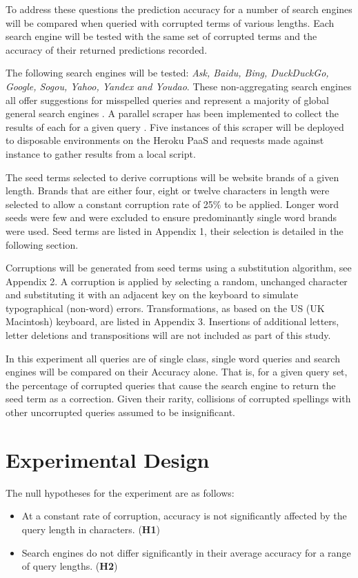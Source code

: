 \documentclass{csfourzero}
\begin{document}
To address these questions the prediction accuracy for a number of search engines will be compared when queried with corrupted terms of various lengths. Each search engine will be tested with the same set of corrupted terms and the accuracy of their returned predictions recorded.

The following search engines will be tested: \textit{Ask, Baidu, Bing, DuckDuckGo, Google, Sogou, Yahoo, Yandex and Youdao}. These non-aggregating search engines all offer suggestions for misspelled queries and represent a majority of global general search engines \cite{searchenginewiki}. A parallel scraper has been implemented to collect the results of each for a given query \cite{scraper}. Five instances of this scraper will be deployed to disposable environments on the Heroku PaaS and requests made against instance to gather results from a local script.

The seed terms selected to derive corruptions will be website brands of a given length. Brands that are either four, eight or twelve characters in length were selected to allow a constant corruption rate of 25\% to be applied. Longer word seeds were few and were excluded to ensure predominantly single word brands were used. Seed terms are listed in Appendix 1, their selection is detailed in the following section.

Corruptions will be generated from seed terms using a substitution algorithm, see Appendix 2. A corruption is applied by selecting a random, unchanged character and substituting it with an adjacent key on the keyboard to simulate typographical (non-word) errors. Transformations, as based on the US (UK Macintosh) keyboard, are listed in Appendix 3. Insertions of additional letters, letter deletions and transpositions will are not included as part of this study.

In this experiment all queries are of single class, single word queries and search engines will be compared on their Accuracy alone. That is, for a given query set, the percentage of corrupted queries that cause the search engine to return the seed term as a correction. Given their rarity, collisions of corrupted spellings with other uncorrupted queries assumed to be insignificant.

\section{Experimental Design}
\label{sec:exp}

The null hypotheses for the experiment are as follows:
\begin{itemize}
  \item{At a constant rate of corruption, accuracy is not significantly affected by the query length in characters. (\textbf{H1})}
  \item{Search engines do not differ significantly in their average accuracy for a range of query lengths. (\textbf{H2})}
\end{itemize}
\end{document}

